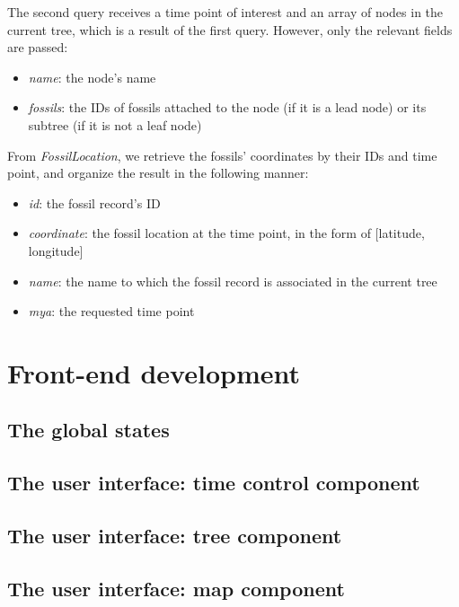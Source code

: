 \documentclass[11pt, a4paper,oneside,chapterprefix=false]{scrbook}
\begin{document}
The second query receives a time point of interest and an array of nodes in the current tree, which is a result of the first query. However, only the relevant fields are passed: 
\begin{itemize}
	\item \textit{name}: the node's name
	\item \textit{fossils}: the IDs of fossils attached to the node (if it is a lead node) or its subtree (if it is not a leaf node)
\end{itemize}

From \emph{FossilLocation}, we retrieve the fossils' coordinates by their IDs and time point, and organize the result in the following manner:

\begin{itemize}
	\item \textit{id}: the fossil record's ID
	\item \textit{coordinate}: the fossil location at the time point, in the form of [latitude, longitude]
	\item \textit{name}: the name to which the fossil record is associated in the current tree
	\item \textit{mya}: the requested time point 
\end{itemize}

\section{Front-end development} \label{sec:tec_frontend}
\subsection{The global states}\label{subsec:tec_frontend_global_states}
\subsection{The user interface: time control component}\label{subsec:tec_frontend_time}
\subsection{The user interface: tree component}\label{subsec:tec_frontend_tree}
\subsection{The user interface: map component}\label{subsec:tec_frontend_map}


\end{document}
